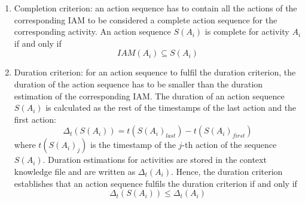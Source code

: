 \begin{enumerate}
  \item Completion criterion: an action sequence has to contain all the actions of the corresponding IAM to be considered a complete action sequence for the corresponding activity. An action sequence $S(A_i)$ is complete for activity $A_i$ if and only if 
  \begin{equation}
  \label{eq-completion}
  IAM(A_i) \subseteq S(A_i)   
  \end{equation}
  
  \item Duration criterion: for an action sequence to fulfil the duration criterion, the duration of the action sequence has to be smaller than the duration estimation of the corresponding IAM. The duration of an action sequence $S(A_i)$ is calculated as the rest of the timestamps of the last action and the first action: 
  \begin{equation}
    \Delta_t(S(A_i)) = t(S(A_i)_{last}) - t(S(A_i)_{first})
  \end{equation}
  where $t(S(A_i)_j)$ is the timestamp of the $j$-th action of the sequence $S(A_i)$. Duration estimations for activities are stored in the context knowledge file and are written as $\Delta_t(A_i)$. Hence, the duration criterion establishes that an action sequence fulfils the duration criterion if and only if 
  \begin{equation}
   \label{eq-duration}
   \Delta_t(S(A_i)) \leq \Delta_t(A_i)
  \end{equation}  
  

\end{enumerate}
